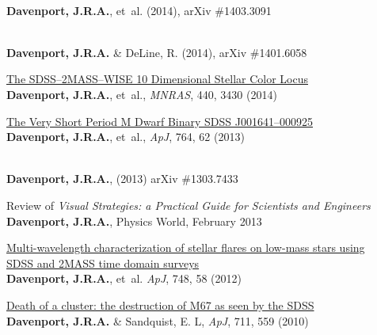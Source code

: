 \begin{etaremune}[leftmargin=10pt]
\item\href{http://arxiv.org/abs/1403.3091}{\color{NavyBlue}{\sc Studying Gender in Conference Talks -- data from the 223rd meeting of the\\ American Astronomical Society}}\\
{\bf Davenport, J.R.A.}, et~al.  (2014), arXiv \#1403.3091


\item\href{http://arxiv.org/abs/1401.6058}{\color{NavyBlue}{\sc The Readability of Tweets and their Geographic Correlation with Education}}\\
{\bf Davenport, J.R.A.} \& DeLine, R. (2014), arXiv \#1401.6058


\item{\sc \href{http://adsabs.harvard.edu/abs/2014MNRAS.440.3430D}{\color{NavyBlue}The SDSS--2MASS--WISE 10 Dimensional Stellar Color Locus}}\\
{\bf Davenport, J.R.A.}, et~al., {\em MNRAS}, 440, 3430 (2014)


\item{\sc \href{http://adsabs.harvard.edu/abs/2013ApJ...764...62D}{\color{NavyBlue}The Very Short Period M Dwarf Binary SDSS J001641--000925}}\\
{\bf Davenport, J.R.A.}, et~al., {\em ApJ}, 764, 62 (2013)

\item\href{http://arxiv.org/abs/1303.7433}{\color{NavyBlue}{\sc Unidentified Moving Objects in Next Generation Time Domain Surveys}}\\
{\bf Davenport, J.R.A.}, (2013) arXiv \#1303.7433

\item\href{http://physicsworld.com/cws/article/print/2013/feb/14/visible-improvements}{\color{NavyBlue}{\sc Visible Improvements,}} Review of {\it Visual Strategies: a Practical Guide for Scientists and Engineers} {\bf Davenport, J.R.A.},  Physics World, February 2013


\item{\sc \href{http://adsabs.harvard.edu/abs/2012ApJ...748...58D}{\color{NavyBlue}Multi-wavelength characterization of stellar flares on low-mass stars using \\SDSS and 2MASS time domain surveys}}\\
{\bf Davenport, J.R.A.}, et~al. {\em ApJ}, 748, 58 (2012)

\item{\sc \href{http://adsabs.harvard.edu/abs/2010ApJ...711..559D}{\color{NavyBlue}Death of a cluster: the destruction of M67 as seen by the SDSS}}\\
{\bf Davenport, J.R.A.} \& Sandquist, E. L, {\em ApJ}, 711, 559 (2010)


\end{etaremune}
